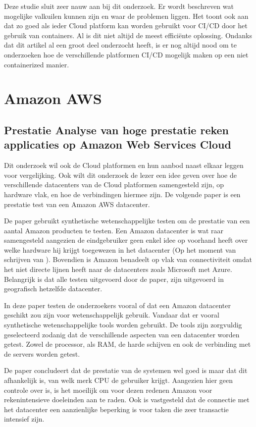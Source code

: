 Deze studie \autocite{Debroy2018} sluit zeer nauw aan bij dit onderzoek. Er wordt beschreven wat mogelijke valkuilen kunnen zijn en waar de problemen liggen. Het toont ook aan dat zo goed als ieder Cloud platform kan worden gebruikt voor CI/CD door het gebruik van containers. Al is dit niet altijd de meest efficiënte oplossing. Ondanks dat dit artikel al een groot deel onderzocht heeft, is er nog altijd nood om te onderzoeken hoe de verschillende platformen CI/CD mogelijk maken op een niet containerized manier.

\section{Amazon AWS}
\subsection{Prestatie Analyse van hoge prestatie reken applicaties op Amazon Web Services Cloud}
Dit onderzoek wil ook de Cloud platformen en hun aanbod naast elkaar leggen voor vergelijking. Ook wilt dit onderzoek de lezer een idee geven over hoe de verschillende datacenters van de Cloud platformen samengesteld zijn, op hardware vlak, en hoe de verbindingen hiermee zijn. De volgende paper \autocite{Jackson2010} is een prestatie test van een Amazon AWS datacenter.

De paper \autocite{Jackson2010} gebruikt synthetische wetenschappelijke testen om de prestatie van een aantal Amazon producten te testen. Een Amazon datacenter is wat raar samengesteld aangezien de eindgebruiker geen enkel idee op voorhand heeft over welke hardware hij krijgt toegewezen in het datacenter (Op het moment van schrijven van \autocite{Jackson2010}). Bovendien is Amazon benadeelt op vlak van connectiviteit omdat het niet directe lijnen heeft naar de datacenters zoals Microsoft met Azure. Belangrijk is dat alle testen uitgevoerd door de paper, zijn uitgevoerd in geografisch hetzelfde datacenter.

In deze paper \autocite{Jackson2010} testen de onderzoekers vooral of dat een Amazon datacenter geschikt zou zijn voor wetenschappelijk gebruik. Vandaar dat er vooral synthetische wetenschappelijke tools worden gebruikt. De tools zijn zorgvuldig geselecteerd zodanig dat de verschillende aspecten van een datacenter worden getest. Zowel de processor, als RAM, de harde schijven en ook de verbinding met de servers worden getest.

De paper \autocite{Jackson2010} concludeert dat de prestatie van de systemen wel goed is maar dat dit afhankelijk is, van welk merk CPU de gebruiker krijgt. Aangezien hier geen controle over is, is het moeilijk om voor dezen redenen Amazon voor rekenintensieve doeleinden aan te raden. Ook is vastgesteld dat de connectie met het datacenter een aanzienlijke beperking is voor taken die zeer transactie intensief zijn.

